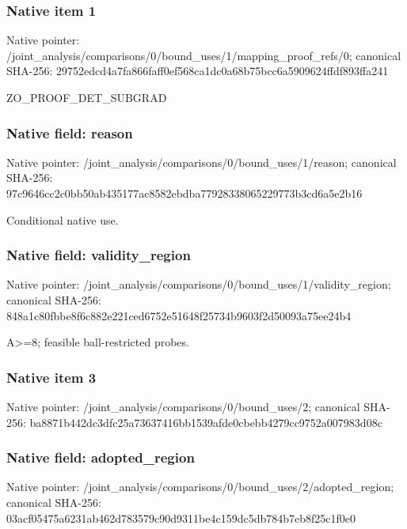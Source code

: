 \documentclass[10pt,a4paper]{article}
\begin{document}
\subsubsection{Native item 1}
Native pointer: /joint\_\allowbreak{}analysis/comparisons/0/bound\_\allowbreak{}uses/1/mapping\_\allowbreak{}proof\_\allowbreak{}refs/0; canonical SHA-256: 29752edcd4a7fa866faff0ef568ca1dc0a68b75bcc6a5909624ffdf893ffa241

\begingroup\raggedright\sloppy ZO\_\allowbreak{}PROOF\_\allowbreak{}DET\_\allowbreak{}SUBGRAD\par\endgroup

\subsubsection{Native field: reason}
Native pointer: /joint\_\allowbreak{}analysis/comparisons/0/bound\_\allowbreak{}uses/1/reason; canonical SHA-256: 97c9646cc2c0bb50ab435177ac8582ebdba77928338065229773b3cd6a5e2b16

\begingroup\raggedright\sloppy Conditional native use.\par\endgroup

\subsubsection{Native field: validity\_\allowbreak{}region}
Native pointer: /joint\_\allowbreak{}analysis/comparisons/0/bound\_\allowbreak{}uses/1/validity\_\allowbreak{}region; canonical SHA-256: 848a1c80fbbe8f6c882e221ced6752e51648f25734b9603f2d50093a75ee24b4

\begingroup\raggedright\sloppy A>=\allowbreak{}8;\allowbreak{} feasible ball-restricted probes.\par\endgroup

\subsubsection{Native item 3}
Native pointer: /joint\_\allowbreak{}analysis/comparisons/0/bound\_\allowbreak{}uses/2; canonical SHA-256: ba8871b442dc3dfc25a73637416bb1539afde0cbebb4279cc9752a007983d08c

\subsubsection{Native field: adopted\_\allowbreak{}region}
Native pointer: /joint\_\allowbreak{}analysis/comparisons/0/bound\_\allowbreak{}uses/2/adopted\_\allowbreak{}region; canonical SHA-256: 03acf05475a6231ab462d783579c90d9311be4c159dc5db784b7eb8f25c1f0e0
\end{document}
